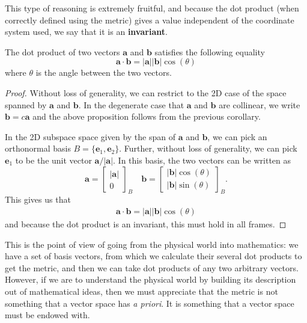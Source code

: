 \documentclass[../master.tex]{subfiles}
\begin{document}
	This type of reasoning is extremely fruitful, and because the dot product (when correctly defined using the metric) gives a value independent of the coordinate system used, we say that it is an \textbf{invariant}.
	
	\begin{prop}
		The dot product of two vectors $\mathbf a$ and $\mathbf b$ satisfies the following equality
		\begin{equation}
			\mathbf a \cdot \mathbf b = |\mathbf a| |\mathbf b| \cos(\theta)
		\end{equation}
		where $\theta$ is the angle between the two vectors.
	\end{prop}
	\begin{proof}
		Without loss of generality, we can restrict to the 2D case of the space spanned by $\mathbf a$ and $\mathbf b$.
		In the degenerate case that $\mathbf a$ and $\mathbf b$ are collinear, we write $\mathbf b = c \mathbf a$ and the above proposition follows from the previous corollary. 
		
		In the 2D subspace space given by the span of $\mathbf a$ and $\mathbf b$, we can pick an orthonormal basis $B = \{\mathbf e_1, \mathbf e_2\}$. Further, without loss of generality, we can pick $\mathbf e_1$ to be the unit vector $\mathbf a/|\mathbf a|$. In this basis, the two vectors can be written as
		\begin{equation*}
			\mathbf a = \begin{bmatrix}
				|\mathbf a|\\
				0
			\end{bmatrix}_B
			\quad
			\mathbf b = \begin{bmatrix}
				|\mathbf b| \cos(\theta)\\
				|\mathbf b| \sin(\theta)
			\end{bmatrix}_B.
		\end{equation*}
		This gives us that
		\begin{equation*}
			\begin{aligned}
				\mathbf a \cdot \mathbf b = |\mathbf a| |\mathbf b| \cos(\theta)
			\end{aligned}
		\end{equation*}
		and because the dot product is an invariant, this must hold in all frames.
	\end{proof}
	
	This is the point of view of going from the physical world into mathematics: we have a set of basis vectors, from which we calculate their several dot products to get the metric, and then we can take dot products of any two arbitrary vectors. However, if we are to understand the physical world by building its description out of mathematical ideas, then we must appreciate that the metric is not something that a vector space has \emph{a priori}. It is something that a vector space must be endowed with.
	
\end{document}
